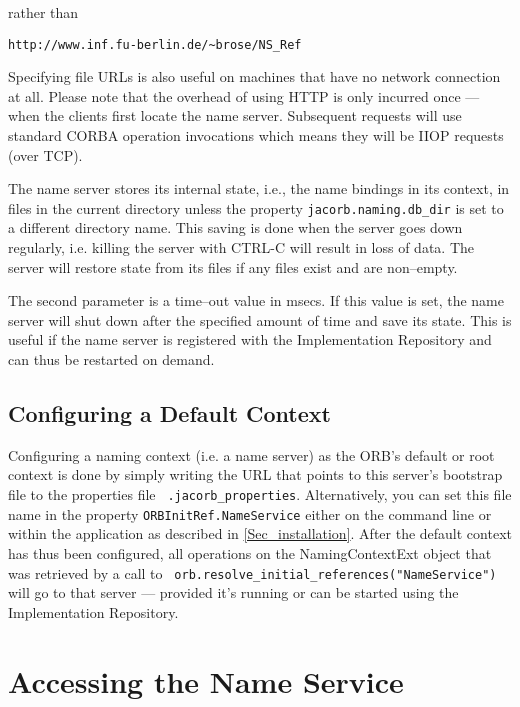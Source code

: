 \documentclass[12pt]{scrbook}
\begin{document}

rather than 

\noindent\verb+http://www.inf.fu-berlin.de/~brose/NS_Ref+

Specifying file URLs  is also useful on machines  that have no network
connection at all. Please note that the overhead of using HTTP is only
incurred  once ---  when the  clients  first locate  the name  server.
Subsequent  requests  will use  standard  CORBA operation  invocations
which means they will be IIOP requests (over TCP).

The name server stores its  internal state, i.e., the name bindings in
its context,  in files  in the current  directory unless  the property
{\tt jacorb.naming.db\_dir} is set to a different directory name. This
saving is done  when the server goes down  regularly, i.e. killing the
server  with CTRL-C  will result  in loss  of data.   The  server will
restore state from its files if any files exist and are non--empty.

The second  parameter is a time--out  value in msecs. If  this value is
set, the name server will shut down after the specified amount of time
and save  its state. This is  useful if the name  server is registered
with  the  Implementation Repository  and  can  thus  be restarted  on
demand.

\subsection*{Configuring a Default Context}

Configuring a naming context (i.e. a name server) as the ORB's default
or root context is done by  simply writing the URL that points to this
server's    bootstrap    file   to    the    properties   file    {\tt
.jacorb\_properties}.  Alternatively,  you can  set this file  name in
the property {\tt ORBInitRef.NameService} either on the command line or
within the application  as described in \ref{Sec_installation}.  After
the default  context has thus  been configured, all operations  on the
NamingContextExt  object  that  was   retrieved  by  a  call  to  {\tt
orb.resolve\_initial\_references("NameService")}   will  go   to  that
server  ---  provided  it's  running  or  can  be  started  using  the
Implementation Repository.

\section{Accessing the Name Service}
\end{document}

